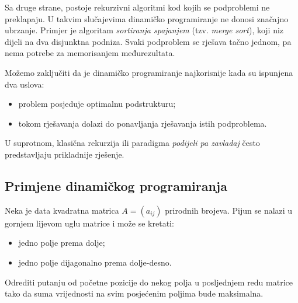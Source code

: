 Sa druge strane, postoje rekurzivni algoritmi kod kojih se podproblemi ne preklapaju. U takvim slučajevima dinamičko programiranje ne donosi značajno ubrzanje. Primjer je algoritam \emph{sortiranja spajanjem} (tzv. \emph{merge sort}), koji niz dijeli na dva disjunktna podniza. Svaki podproblem se rješava tačno jednom, pa nema potrebe za memorisanjem međurezultata.

Možemo zaključiti da je dinamičko programiranje najkorisnije kada su ispunjena dva uslova:

\begin{itemize}
	\item problem posjeduje optimalnu podstrukturu;
	\item tokom rješavanja dolazi do ponavljanja rješavanja istih podproblema.
\end{itemize}

U suprotnom, klasična rekurzija ili paradigma \emph{podijeli pa zavladaj} često predstavljaju prikladnije rješenje.

\subsection{Primjene dinamičkog programiranja}

\begin{example}
	Neka je data kvadratna matrica $A=(a_{ij})$ prirodnih brojeva. Pijun se nalazi u gornjem lijevom uglu matrice i može se kretati:
	\begin{itemize}
		\item jedno polje prema dolje;
		\item jedno polje dijagonalno prema dolje-desno.
	\end{itemize}
	
	Odrediti putanju od početne pozicije do nekog polja u posljednjem redu matrice tako da suma vrijednosti na svim posjećenim poljima bude maksimalna.
	
\end{example}

